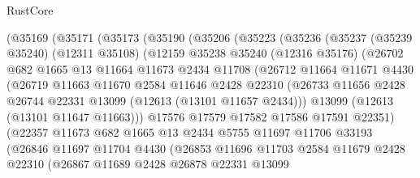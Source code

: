 \begin{lexlean}{RustCore}
\begin{coremodule}
      (@35169
        (@35171
          (@35173
            (@35190
              (@35206
                (@35223
                  (@35236
                    (@35237
                      (@35239 @35240)
                      (@12311 @35108)
                      (@12159
                        @35238
                        @35240
                        (@12316 @35176)
                        (@26702
                          @682
                          @1665
                          @13
                          @11664
                          @11673
                          @2434
                          @11708
                          (@26712
                            @11664
                            @11671
                            @4430
                            (@26719
                              @11663
                              @11670
                              @2584
                              @11646
                              @2428
                              @22310
                              (@26733
                                @11656
                                @2428
                                @26744
                                @22331
                                @13099
                                (@12613 (@13101 @11657 @2434)))
                              @13099
                              (@12613 (@13101 @11647 @11663)))
                            @17576
                            @17579
                            @17582
                            @17586
                            @17591
                            @22351)
                          (@22357
                            @11673
                            @682
                            @1665
                            @13
                            @2434
                            @5755
                            @11697
                            @11706
                            @33193
                            (@26846
                              @11697
                              @11704
                              @4430
                              (@26853
                                @11696
                                @11703
                                @2584
                                @11679
                                @2428
                                @22310
                                (@26867
                                  @11689
                                  @2428
                                  @26878
                                  @22331
                                  @13099

\end{coremodule}
\end{lexlean}
